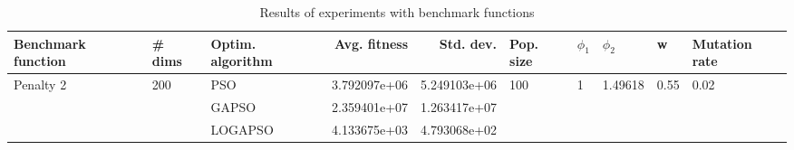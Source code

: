 \begin{table}
\centering
\caption{Results of experiments with benchmark functions}
\begin{tabular}{lllrrlllll}
\toprule
        Benchmark function &              \# dims & Optim. algorithm &  Avg. fitness &    Std. dev. &            Pop. size &         $\phi_{1}$ &               $\phi_{2}$ &                     w &         Mutation rate \\
\midrule
\multirow{3}{*}{Penalty 2} & \multirow{3}{*}{200} &              PSO &  3.792097e+06 & 5.249103e+06 & \multirow{3}{*}{100} & \multirow{3}{*}{1} & \multirow{3}{*}{1.49618} & \multirow{3}{*}{0.55} & \multirow{3}{*}{0.02} \\
                           &                      &            GAPSO &  2.359401e+07 & 1.263417e+07 &                      &                    &                          &                       &                       \\
                           &                      &          LOGAPSO &  4.133675e+03 & 4.793068e+02 &                      &                    &                          &                       &                       \\
\bottomrule
\end{tabular}
\end{table}
